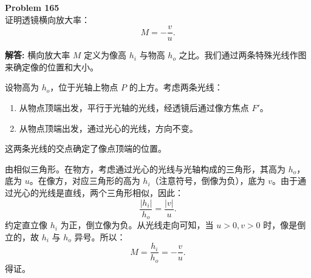 \documentclass[12pt, a4paper, oneside]{ctexart}
\newenvironment{solution}{\par\noindent\textbf{解答:}\quad}{\par}
\begin{document}
\begin{mdframed}[backgroundcolor=gray!10, linewidth=0pt]
    \textbf{Problem 165} \\
    证明透镜横向放大率：
    \[
    M = -\frac{v}{u}.
    \]
\end{mdframed}
\begin{solution}
    横向放大率 $M$ 定义为像高 $h_i$ 与物高 $h_o$ 之比。我们通过两条特殊光线作图来确定像的位置和大小。

    设物高为 $h_o$，位于光轴上物点 $P$ 的上方。考虑两条光线：
    \begin{enumerate}
        \item 从物点顶端出发，平行于光轴的光线，经透镜后通过像方焦点 $F'$。
        \item 从物点顶端出发，通过光心的光线，方向不变。
    \end{enumerate}
    这两条光线的交点确定了像点顶端的位置。

    由相似三角形。在物方，考虑通过光心的光线与光轴构成的三角形，其高为 $h_o$，底为 $u$。在像方，对应三角形的高为 $h_i$（注意符号，倒像为负），底为 $v$。由于通过光心的光线是直线，两个三角形相似，因此：
    \[
    \frac{|h_i|}{h_o} = \frac{|v|}{u}.
    \]
    约定直立像 $h_i$ 为正，倒立像为负。从光线走向可知，当 $u>0, v>0$ 时，像是倒立的，故 $h_i$ 与 $h_o$ 异号。所以：
    \[
    M = \frac{h_i}{h_o} = -\frac{v}{u}.
    \]
    得证。
\end{solution}
\end{document}
